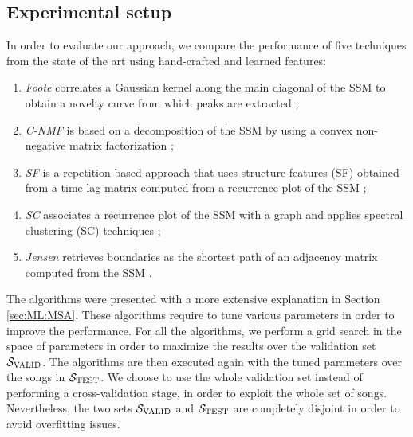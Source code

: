 \subsection{Experimental setup}
In order to evaluate our approach, we compare the performance of five techniques from the state of the art using hand-crafted and learned features:
\begin{enumerate}
\item \textit{Foote} correlates a Gaussian kernel along the main diagonal of the SSM to obtain a novelty curve from which peaks are extracted \cite{foote2000automatic};
\item \textit{C-NMF} is based on a decomposition of the SSM by using a convex non-negative matrix factorization \cite{NietoCNMF}; 
\item \textit{SF} is a repetition-based approach that uses structure features (SF) obtained from a time-lag matrix computed from a recurrence plot of the SSM \cite{Serra2014} ; 
\item \textit{SC} associates a recurrence plot of the SSM with a graph and applies spectral clustering (SC) techniques \cite{mcfee2014}; 
\item \textit{Jensen} retrieves boundaries as the shortest path of an adjacency matrix computed from the SSM \cite{Jensen2007}. 
\end{enumerate}
The algorithms were presented with a more extensive explanation in Section \ref{sec:ML:MSA}. These algorithms require to tune various parameters in order to improve the performance. For all the algorithms, we perform a grid search in the space of parameters in order to maximize the results over the validation set $\mathcal{S}_\text{VALID}$. The algorithms are then executed again with the tuned parameters over the songs in $\mathcal{S}_\text{TEST}$. 
We choose to use the whole validation set instead of performing a cross-validation stage, in order to exploit the whole set of songs. Nevertheless, the two sets $\mathcal{S}_\text{VALID}$ and $\mathcal{S}_\text{TEST}$ are completely disjoint in order to avoid overfitting issues. 

